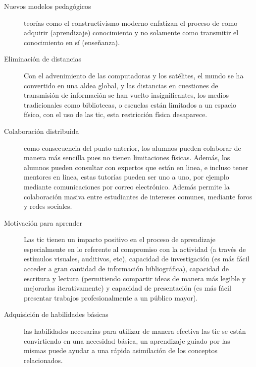 \begin{description}

    \item[Nuevos modelos pedagógicos] teorías como el constructivismo moderno
        enfatizan el proceso de como adquirir (aprendizaje) conocimiento y no
        solamente como transmitir el conocimiento en sí (enseñanza).

    \item[Eliminación de distancias] Con el advenimiento de las computadoras y los
	    satélites, el mundo se ha convertido en una aldea global, y las
	    distancias en cuestiones de transmisión de información se han vuelto
	    insignificantes\cite{mohammed2013information}, los medios
	    tradicionales como bibliotecas, o escuelas están limitados a un
	    espacio físico, con el uso de las \Gls{tic}, esta restricción
	    física desaparece\cite{tinio:ict}.

    \item[Colaboración distribuida] como consecuencia del punto anterior, los
        alumnos pueden colaborar de manera más sencilla pues no tienen
        limitaciones físicas. Además, los alumnos pueden consultar con expertos
        que están en linea, e incluso tener mentores en linea, estas tutorías
        pueden ser uno a uno, por ejemplo mediante comunicaciones por correo
        electrónico. Además permite la colaboración masiva entre estudiantes de
        intereses comunes, mediante foros y redes sociales\cite{unesco:ict}.

    \item[Motivación para aprender] Las \Gls{tic} tienen un impacto positivo en
	    el proceso de aprendizaje especialmente en lo referente al
	    compromiso con la actividad (a través de estímulos visuales,
	    auditivos, etc), capacidad de investigación (es más fácil acceder a
	    gran cantidad de información bibliográfica), capacidad de escritura
	    y lectura (permitiendo compartir ideas de manera más legible y
	    mejorarlas iterativamente) y capacidad de presentación (es más fácil
	    presentar trabajos profesionalmente a un público
	    mayor)\cite{passey2004motivational}\cite{egenfeldt2007third}.

    \item[Adquisición de habilidades básicas] las habilidades necesarias para
	    utilizar de manera efectiva las \Gls{tic} se están convirtiendo en
	    una necesidad básica, un aprendizaje guiado por las mismas puede
	    ayudar a una rápida asimilación de los conceptos relacionados.

\end{description}

